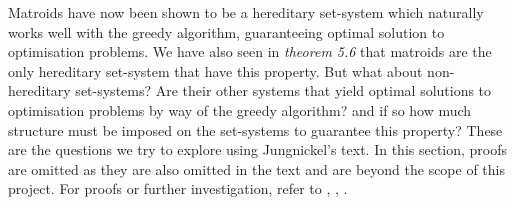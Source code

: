 \documentclass[../main.tex]{subfiles}
\begin{document}
\noindent Matroids have now been shown to be a hereditary set-system which naturally works well with the greedy algorithm, guaranteeing  optimal solution to optimisation problems. We have also seen in \textit{theorem 5.6} that matroids are the only hereditary set-system that have this property. But what about non-hereditary set-systems? Are their other systems that yield optimal solutions to optimisation problems by way of the greedy algorithm? and if so how much structure must be imposed on the set-systems to guarantee this property?
These are the questions we try to explore using Jungnickel's text.\cite{jungnickel} In this section, proofs are omitted as they are also omitted in the text and are beyond the scope of this project. For proofs or further investigation, refer to \cite{bryant_brooksbank}, \cite{kortez__lovasz}, \cite{greedoids}.
\end{document}
